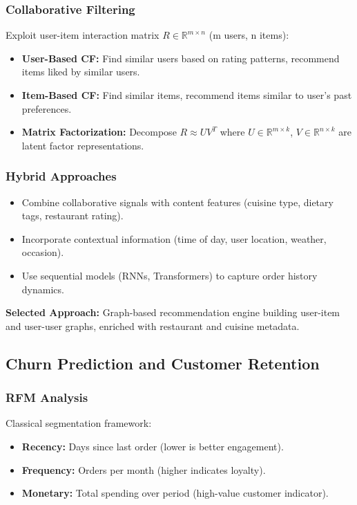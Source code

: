 \documentclass[12pt,a4paper]{report}
\begin{document}
\subsubsection{Collaborative Filtering}
Exploit user-item interaction matrix $R \in \mathbb{R}^{m \times n}$ (m users, n items):
\begin{itemize}
    \item \textbf{User-Based CF:} Find similar users based on rating patterns, recommend items liked by similar users.
    \item \textbf{Item-Based CF:} Find similar items, recommend items similar to user's past preferences.
    \item \textbf{Matrix Factorization:} Decompose $R \approx U V^T$ where $U \in \mathbb{R}^{m \times k}$, $V \in \mathbb{R}^{n \times k}$ are latent factor representations.
\end{itemize}

\subsubsection{Hybrid Approaches}
\begin{itemize}
    \item Combine collaborative signals with content features (cuisine type, dietary tags, restaurant rating).
    \item Incorporate contextual information (time of day, user location, weather, occasion).
    \item Use sequential models (RNNs, Transformers) to capture order history dynamics.
\end{itemize}

\textbf{Selected Approach:} Graph-based recommendation engine building user-item and user-user graphs, enriched with restaurant and cuisine metadata.

\subsection{Churn Prediction and Customer Retention}

\subsubsection{RFM Analysis}
Classical segmentation framework:
\begin{itemize}
    \item \textbf{Recency:} Days since last order (lower is better engagement).
    \item \textbf{Frequency:} Orders per month (higher indicates loyalty).
    \item \textbf{Monetary:} Total spending over period (high-value customer indicator).
\end{itemize}
\end{document}
